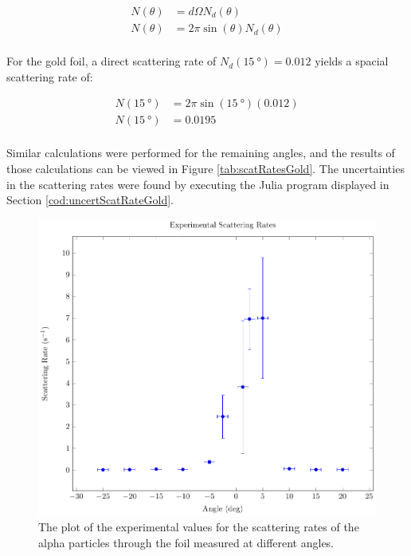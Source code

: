 \documentclass[a4paper]{article}
\begin{document}
\begin{align*}
  N (\theta) &= d\Omega N_d (\theta) \\
  N (\theta) &= 2 \pi \sin{(\theta)} N_d (\theta) \\
\end{align*}

\qq For the gold foil, a direct scattering rate of \( N_d (\SI{15}{\degree}) =
\num{0.012} \) yields a spacial scattering rate of:

\begin{align*}
  N (\SI{15}{\degree}) &= 2 \pi \sin{(\SI{15}{\degree})} (\num{0.012}) \\
  N (\SI{15}{\degree}) &= \num{0.0195} \\
\end{align*}

Similar calculations were performed for the remaining angles, and the results of
those calculations can be viewed in Figure \ref{tab:scatRatesGold}. The
uncertainties in the scattering rates were found by executing the Julia program
displayed in Section \ref{cod:uncertScatRateGold}.

\begin{figure}[H]
  \begin{center}
    \includegraphics[scale=0.8]{Plots/ExperimentalScatteringRates/expScatRates.pdf}
  \end{center}
  \caption{The plot of the experimental values for the scattering rates of the
    alpha particles through the foil measured at different angles.}
  \label{gph:expScatRatesGold}
\end{figure}
\end{document}
